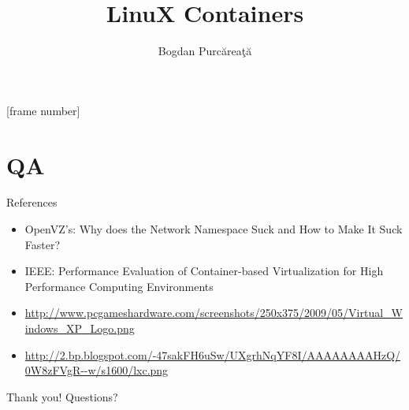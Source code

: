 \documentclass{beamer}
\title{LinuX Containers}
\author{Bogdan Purc\u{a}rea\c{t}\u{a}}
\begin{document}
[frame number]

\frame{\titlepage}

\frame{\tableofcontents}









\section{QA}

\begin{frame}{References}
\begin{itemize}
\item OpenVZ's: Why does the Network Namespace Suck and How to Make It Suck Faster?
\item IEEE: Performance Evaluation of Container-based Virtualization for High Performance Computing Environments
\item \url{http://www.pcgameshardware.com/screenshots/250x375/2009/05/Virtual_Windows_XP_Logo.png}
\item \url{http://2.bp.blogspot.com/-47sakFH6uSw/UXgrhNqYF8I/AAAAAAAAHzQ/0W8zFVgR--w/s1600/lxc.png}
\end{itemize}
\end{frame}

\begin{frame}{Thank you!}
\centering
Questions?
\end{frame}
\end{document}

